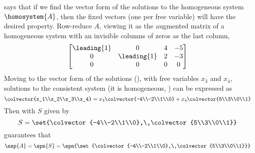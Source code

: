  says that if we find the vector form of the solutions to the homogeneous system $\homosystem{A}$, then the fixed vectors (one per free variable) will have the desired property.  Row-reduce $A$, viewing it as the augmented matrix of a homogeneous system with an invisible columns of zeros as the last column,
%
\begin{equation*}
\begin{bmatrix}
\leading{1} & 0 & 4 & -5\\
0 & \leading{1} & 2 & -3\\ 
0 & 0 & 0 & 0
\end{bmatrix}
\end{equation*}
%
Moving to the vector form of the solutions (), with free variables $x_3$ and $x_4$, solutions to the consistent system (it is homogeneous, ) can be expressed as
%
\begin{equation*}
\colvector{x_1\\x_2\\x_3\\x_4}
=
x_3\colvector{-4\\-2\\1\\0}+
x_4\colvector{5\\3\\0\\1}
\end{equation*}
%
Then with $S$ given by 
%
\begin{equation*}
S=\set{\colvector{-4\\-2\\1\\0},\,\colvector{5\\3\\0\\1}}
\end{equation*}
%
 guarantees that
%
\begin{equation*}
\nsp{A}=\spn{S}=\spn{\set{\colvector{-4\\-2\\1\\0},\,\colvector{5\\3\\0\\1}}}
\end{equation*}
%
